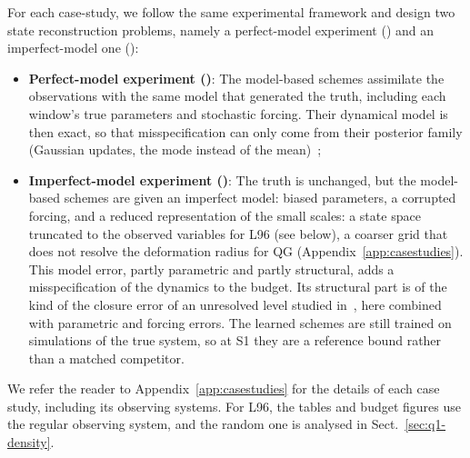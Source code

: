 For each case-study, we follow the same experimental framework and design two state reconstruction problems, namely a perfect-model experiment (\Sz{}) and an imperfect-model one (\So{}):
\begin{itemize}
    \item {\bf Perfect-model experiment (\Sz{})}: The model-based schemes assimilate the observations with the same model that generated the truth, including each window's true parameters and stochastic forcing. Their dynamical model is then exact, so that misspecification can only come from their posterior family (Gaussian updates, the mode instead of the mean)~\cite{fablet_not_2026};
    \item {\bf Imperfect-model experiment (\So{})}: The truth is unchanged, but the model-based schemes are given an imperfect model: biased parameters, a corrupted forcing, and a reduced representation of the small scales: a state space truncated to the observed variables for L96 (see below), a coarser grid that does not resolve the deformation radius for QG (Appendix~\ref{app:casestudies}). This model error, partly parametric and partly structural, adds a misspecification of the dynamics to the budget. Its structural part is of the kind of the closure error of an unresolved level studied in~\cite{fablet_not_2026,fablet_flow_2026}, here combined with parametric and forcing errors. The learned schemes are still trained on simulations of the true system, so at S1 they are a reference bound rather than a matched competitor.
\end{itemize}
We refer the reader to Appendix~\ref{app:casestudies} for the details of each case study, including its observing systems. For L96, the tables and budget figures use the regular observing system, and the random one is analysed in Sect.~\ref{sec:q1-density}.



